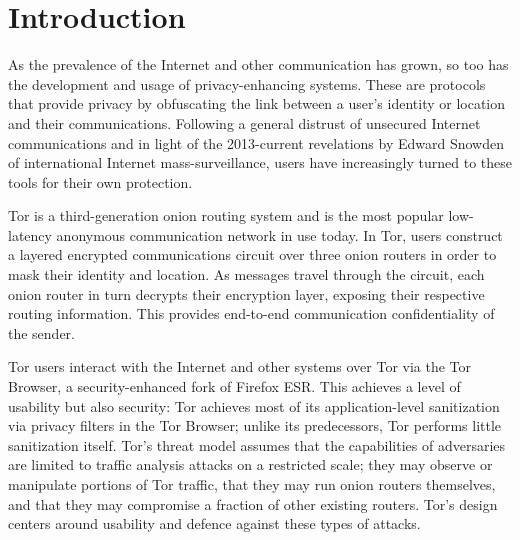 \documentclass{sig-alternate}
\begin{document}


\printccsdesc


\section{Introduction}

As the prevalence of the Internet and other communication has grown, so too has the development and usage of privacy-enhancing systems. These are protocols that provide privacy by obfuscating the link between a user's identity or location and their communications. Following a general distrust of unsecured Internet communications and in light of the 2013-current revelations by Edward Snowden of international Internet mass-surveillance, users have increasingly turned to these tools for their own protection.

Tor\cite{dingledine2004tor} is a third-generation onion routing system and is the most popular low-latency anonymous communication network in use today. In Tor, users construct a layered encrypted communications circuit over three onion routers in order to mask their identity and location. As messages travel through the circuit, each onion router in turn decrypts their encryption layer, exposing their respective routing information. This provides end-to-end communication confidentiality of the sender.

Tor users interact with the Internet and other systems over Tor via the Tor Browser, a security-enhanced fork of Firefox ESR. This achieves a level of usability but also security: Tor achieves most of its application-level sanitization via privacy filters in the Tor Browser; unlike its predecessors, Tor performs little sanitization itself. Tor's threat model assumes that the capabilities of adversaries are limited to traffic analysis attacks on a restricted scale; they may observe or manipulate portions of Tor traffic, that they may run onion routers themselves, and that they may compromise a fraction of other existing routers. Tor's design centers around usability and defence against these types of attacks.
\end{document}
